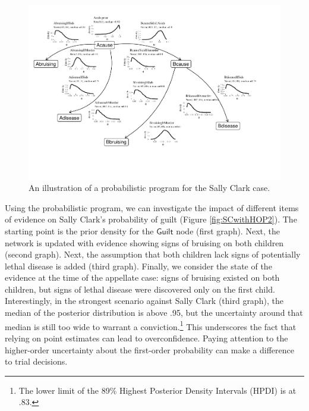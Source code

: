 \documentclass[
  10pt,
  dvipsnames,enabledeprecatedfontcommands]{scrartcl}
\newcommand{\s}[1]{\mbox{$\mathsf{#1}$}}
\begin{document}
\begin{figure}[H]

\begin{center}\includegraphics[width=1.1\linewidth,height=2\textheight,angle=90]{imprecision_philosophical_paper2_files/figure-latex/SCwithHOP-1} \end{center}

\caption{An illustration of a probabilistic program for the Sally Clark case.}
\label{fig:SCwithHOP}
\end{figure}

Using the probabilistic program, we can investigate the impact of
different items of evidence on Sally Clark's probability of guilt
(Figure \ref{fig:SCwithHOP2}). The starting point is the prior density
for the \s{Guilt} node (first graph). Next, the network is updated with
evidence showing signs of bruising on both children (second graph).
Next, the assumption that both children lack signs of potentially lethal
disease is added (third graph). Finally, we consider the state of the
evidence at the time of the appellate case: signs of bruising existed on
both children, but signs of lethal disease were discovered only on the
first child. Interestingly, in the strongest scenario against Sally
Clark (third graph), the median of the posterior distribution is above
.95, but the uncertainty around that median is still too wide to warrant
a conviction.\footnote{The lower limit of the 89\% Highest Posterior
  Density Intervals (HPDI) is at .83.} This underscores the fact that
relying on point estimates can lead to overconfidence. Paying attention
to the higher-order uncertainty about the first-order probability can
make a difference to trial decisions.
\end{document}
